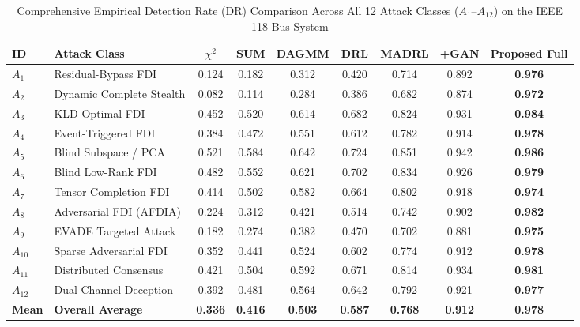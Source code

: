 \documentclass[journal,compsoc]{IEEEtran}
\begin{document}
\begin{table}[!t]
\centering
\caption{Comprehensive Empirical Detection Rate (DR) Comparison Across All 12 Attack Classes ($A_1$--$A_{12}$) on the IEEE 118-Bus System}
\label{tab:results}
\small
\begin{tabularx}{\textwidth}{l p{3.2cm} c c c c c c c}
\toprule
\textbf{ID} & \textbf{Attack Class} & \textbf{$\chi^2$ \cite{ref10}} & \textbf{SUM \cite{ref18}} & \textbf{DAGMM \cite{ref40}} & \textbf{DRL \cite{ref34}} & \textbf{MADRL \cite{ref53}} & \textbf{+GAN \cite{ref70}} & \textbf{Proposed Full} \\
\midrule
$A_1$ & Residual-Bypass FDI & 0.124 & 0.182 & 0.312 & 0.420 & 0.714 & 0.892 & \textbf{0.976} \\
$A_2$ & Dynamic Complete Stealth & 0.082 & 0.114 & 0.284 & 0.386 & 0.682 & 0.874 & \textbf{0.972} \\
$A_3$ & KLD-Optimal FDI & 0.452 & 0.520 & 0.614 & 0.682 & 0.824 & 0.931 & \textbf{0.984} \\
$A_4$ & Event-Triggered FDI & 0.384 & 0.472 & 0.551 & 0.612 & 0.782 & 0.914 & \textbf{0.978} \\
$A_5$ & Blind Subspace / PCA & 0.521 & 0.584 & 0.642 & 0.724 & 0.851 & 0.942 & \textbf{0.986} \\
$A_6$ & Blind Low-Rank FDI & 0.482 & 0.552 & 0.621 & 0.702 & 0.834 & 0.926 & \textbf{0.979} \\
$A_7$ & Tensor Completion FDI & 0.414 & 0.502 & 0.582 & 0.664 & 0.802 & 0.918 & \textbf{0.974} \\
$A_8$ & Adversarial FDI (AFDIA) & 0.224 & 0.312 & 0.421 & 0.514 & 0.742 & 0.902 & \textbf{0.982} \\
$A_9$ & EVADE Targeted Attack & 0.182 & 0.274 & 0.382 & 0.470 & 0.702 & 0.881 & \textbf{0.975} \\
$A_{10}$ & Sparse Adversarial FDI & 0.352 & 0.441 & 0.524 & 0.602 & 0.774 & 0.912 & \textbf{0.978} \\
$A_{11}$ & Distributed Consensus & 0.421 & 0.504 & 0.592 & 0.671 & 0.814 & 0.934 & \textbf{0.981} \\
$A_{12}$ & Dual-Channel Deception & 0.392 & 0.481 & 0.564 & 0.642 & 0.792 & 0.921 & \textbf{0.977} \\
\midrule
\textbf{Mean} & \textbf{Overall Average} & \textbf{0.336} & \textbf{0.416} & \textbf{0.503} & \textbf{0.587} & \textbf{0.768} & \textbf{0.912} & \textbf{0.978} \\
\bottomrule
\end{tabularx}
\end{table}
\end{document}
